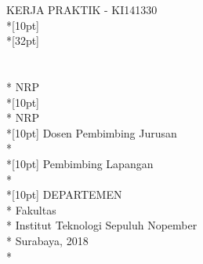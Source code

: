 \newpage

	\sffamily
	\thispagestyle{empty}
	\color{white}
	{ \noindent KERJA PRAKTIK - KI141330 }\\*[10pt] 
	{\large\textbf{\MakeUppercase{\judul}}} \\*[32pt]
	\\
	\\
	\MakeUppercase{\penulis} \\*
	NRP \nrp \\*[10pt]
	\MakeUppercase{\penulisDua} \\*
	NRP \nrpDua \\*[10pt]
	Dosen Pembimbing Jurusan \\*
	\pembimbingJurusan \\*[10pt]
	Pembimbing Lapangan \\*
	\pembimbingLapangan \\*[10pt]
	DEPARTEMEN \MakeUppercase{\jurusan} \\*
	Fakultas \fakultas \\*
	Institut Teknologi Sepuluh Nopember \\*
	Surabaya, 2018 \\*
	\rmfamily
	\normalsize
	\restoregeometry
	\color{black}
	\cleardoublepage
	
